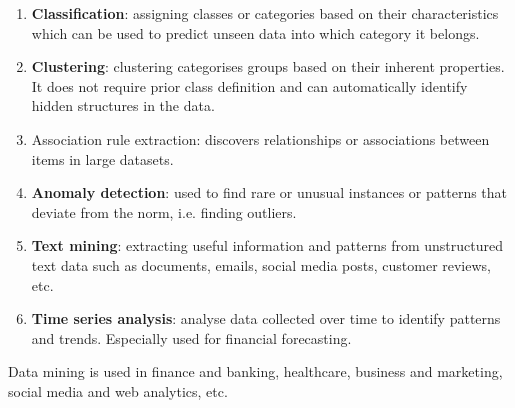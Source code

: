 \documentclass[a4paper, 12pt]{article}
\theoremstyle{plain}
\theoremstyle{definition}
\theoremstyle{remark}
\begin{document}
\begin{enumerate}
	\item \textbf{Classification}: assigning classes or categories based on their characteristics which can be used to predict unseen data into which category it belongs.
	\item \textbf{Clustering}: clustering categorises groups based on their inherent properties. It does not require prior class definition and can automatically identify hidden structures in the data.
	\item Association rule extraction: discovers relationships or associations between items in large datasets. 
	\item \textbf{Anomaly detection}: used to find rare or unusual instances or patterns that deviate from the norm, i.e. finding outliers. 
	\item \textbf{Text mining}: extracting useful information and patterns from unstructured text data such as documents, emails, social media posts, customer reviews, etc.
	\item \textbf{Time series analysis}: analyse data collected over time to identify patterns and trends. Especially used for financial forecasting.
\end{enumerate}
Data mining is used in finance and banking, healthcare, business and marketing, social media and web analytics, etc.
\end{document}
